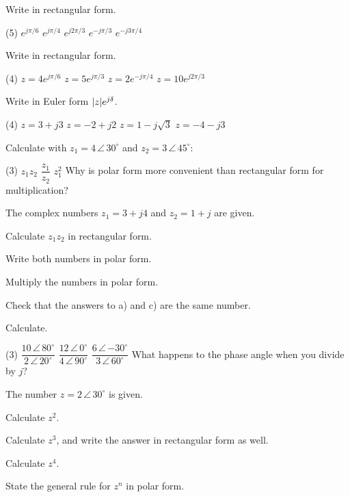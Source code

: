 Write in rectangular form.
\begin{delar}(5)
  \task $e^{j\pi/6}$
  \task $e^{j\pi/4}$
  \task $e^{j2\pi/3}$
  \task $e^{-j\pi/3}$
  \task $e^{-j3\pi/4}$
\end{delar}

Write in rectangular form.
\begin{delar}(4)
  \task $z = 4e^{j\pi/6}$
  \task $z = 5e^{j\pi/3}$
  \task $z = 2e^{-j\pi/4}$
  \task $z = 10e^{j2\pi/3}$
\end{delar}

Write in Euler form $\lvert z\rvert e^{j\delta}$.
\begin{delar}(4)
  \task $z = 3 + j3$
  \task $z = -2 + j2$
  \task $z = 1 - j\sqrt{3}$
  \task $z = -4 - j3$
\end{delar}

Calculate with $z_1 = 4\,\angle\,30^{\circ}$ and $z_2 = 3\,\angle\,45^{\circ}$:
\begin{delar}(3)
  \task $z_1z_2$
  \task $\dfrac{z_1}{z_2}$
  \task $z_1^2$
  \task* Why is polar form more convenient than rectangular form for multiplication?
\end{delar}

The complex numbers $z_1 = 3 + j4$ and $z_2 = 1 + j$ are given.
\begin{parts}
  \item Calculate $z_1z_2$ in rectangular form.
  \item Write both numbers in polar form.
  \item Multiply the numbers in polar form.
  \item Check that the answers to a) and c) are the same number.
\end{parts}

Calculate.
\begin{delar}(3)
  \task $\dfrac{10\,\angle\,80^{\circ}}{2\,\angle\,20^{\circ}}$
  \task $\dfrac{12\,\angle\,0^{\circ}}{4\,\angle\,90^{\circ}}$
  \task $\dfrac{6\,\angle\,{-30^{\circ}}}{3\,\angle\,60^{\circ}}$
  \task* What happens to the phase angle when you divide by $j$?
\end{delar}

The number $z = 2\,\angle\,30^{\circ}$ is given.
\begin{parts}
  \item Calculate $z^2$.
  \item Calculate $z^3$, and write the answer in rectangular form as well.
  \item Calculate $z^4$.
  \item State the general rule for $z^n$ in polar form.
\end{parts}

